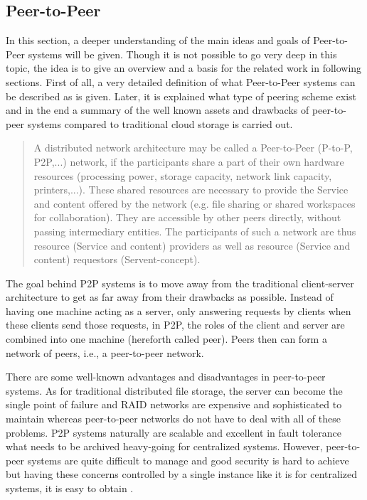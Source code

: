 \subsection{Peer-to-Peer}
In this section, a deeper understanding of the main ideas and goals of Peer-to-Peer systems will be given. Though it is not possible to go very deep in this topic, the idea is to give an overview and a basis for the related work in following sections. First of all, a very detailed definition of what Peer-to-Peer systems can be described as is given. Later, it is explained what type of peering scheme exist and in the end a summary of the well known assets and drawbacks of peer-to-peer systems compared to traditional cloud storage is carried out.
\begin{quote}
A distributed network architecture may be called a Peer-to-Peer (P-to-P, P2P,...) network, if the participants share a part of their own hardware resources (processing power, storage capacity, network link capacity, printers,...). These shared resources are necessary to provide the Service and content offered by the network (e.g. file sharing or shared workspaces for collaboration). They are accessible by other peers directly, without passing intermediary entities. The participants of such a network are thus resource (Service and content) providers as well as resource (Service and content) requestors (Servent-concept)\cite{ptp:definition}.
\end{quote}
The goal behind P2P systems is to move away from the traditional client-server architecture to get as far away from their drawbacks as possible. Instead of having one machine acting as a server, only answering requests by clients when these clients send those requests, in P2P, the roles of the client and server are combined into one machine (hereforth called peer). Peers then can form a network of peers, i.e., a peer-to-peer network.

There are some well-known advantages and disadvantages in peer-to-peer systems. As for traditional distributed file storage, the server can become the single point of failure and RAID networks are expensive and sophisticated to maintain whereas peer-to-peer networks do not have to deal with all of these problems. P2P systems naturally are scalable and excellent in fault tolerance what needs to be archived heavy-going for centralized systems. However, peer-to-peer systems are quite difficult to manage and good security is hard to achieve but having these concerns controlled by a single instance like it is for centralized systems, it is easy to obtain \cite{tomp2p:p2p_introduction}.

